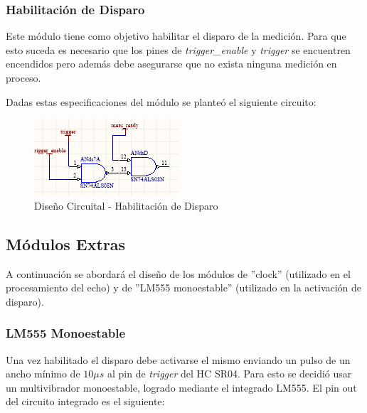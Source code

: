 \subsubsection{Habilitación de Disparo}

Este módulo tiene como objetivo habilitar el disparo de la medición.
Para que esto suceda es necesario que los pines de \textit{trigger\_enable}
y \textit{trigger} se encuentren encendidos pero además debe asegurarse
que no exista ninguna medición en proceso.\newline

Dadas estas especificaciones del módulo se planteó el siguiente circuito:

\begin{figure}[H]
\begin{centering}
\includegraphics[scale=1]{habilitacionDeDisparo.PNG}
\caption{Diseño Circuital - Habilitación de Disparo}
\par\end{centering}
\end{figure}

\subsection{Módulos Extras}

A continuación se abordará el diseño de los módulos de ''clock''
(utilizado en el procesamiento del echo) y de ''LM555 monoestable''
(utilizado en la activación de disparo).

\subsubsection{LM555 Monoestable}

Una vez habilitado el disparo debe activarse el mismo enviando un
pulso de un ancho mínimo de $10\mu s$ al pin de \textit{trigger} del
HC SR04. Para esto se decidió usar un multivibrador monoestable, logrado
mediante el integrado LM555. El pin out del circuito integrado
es el siguiente:

